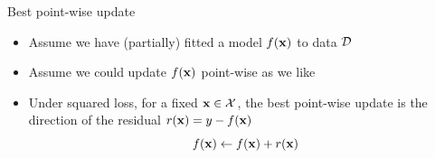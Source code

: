 \documentclass[11pt,compress,t,notes=noshow, xcolor=table]{beamer}
\begin{document}
\begin{frame}[t]{Best point-wise update}

\begin{overlayarea}{\textwidth}{\textheight}

\begin{itemize}
\item Assume we have (partially) fitted a model $f(\mathbf{x})$ to data $\mathcal{D}$ 
\item Assume we could update $f(\mathbf{x})$ point-wise as we like 
\item Under squared loss, for a fixed $\mathbf{x} \in \mathcal{X}$, the best point-wise update is the direction of the residual $r(\mathbf{x}) = y - f(\mathbf{x})$
$$
f(\mathbf{x}) \leftarrow f(\mathbf{x}) + r(\mathbf{x})
$$
\end{itemize}

\begin{center}
\end{center}

\end{overlayarea} 

\end{frame}
\end{document}

